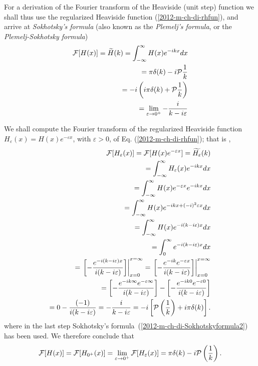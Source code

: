 \fi
For a derivation of  the Fourier transform of the Heaviside (unit step) function
we shall thus use the  regularized Heaviside function (\ref{2012-m-ch-di-rhfun}), and arrive at
{\em Sokhotsky's  formula} (also known as the {\em Plemelj's  formula}, or the {\em Plemelj-Sokhotsky formula})
\begin{equation}
\begin{split}
 {\cal F}[H(x)]=\widetilde{H}(k)=   \int_{-\infty}^\infty  H(x) e^{-i{kx}} dx   \\
\qquad =    \pi \delta(k) -  i {\cal P}  \frac{1}{k} \\
\qquad =   -i \left(i\pi \delta(k) + {\cal P} \frac{1}{k}\right)\\
\qquad =   \lim_{\varepsilon \rightarrow 0^+} -\frac{i}{k-i\varepsilon }
\end{split}
\end{equation}

{\color{OliveGreen}
\bproof
We shall compute the Fourier transform of the regularized Heaviside function
$H_\varepsilon (x) =H(x)e^{-\varepsilon x}$, with $\varepsilon >0$, of Eq. (\ref{2012-m-ch-di-rhfun}); that is  \cite{sommer-di},
\begin{equation}
\begin{split}
 {\cal F}[H_\varepsilon (x)] =
 {\cal F}[H(x)e^{-\varepsilon x}]
=\widetilde{H_\varepsilon }(k)
\\
=   \int_{-\infty}^\infty  H_\varepsilon (x) e^{-i{kx}} dx
\\
=   \int_{-\infty}^\infty  H(x)e^{-\varepsilon x}  e^{-i{kx}} dx
\\
=   \int_{-\infty}^\infty  H(x) e^{-i{kx}+(-i)^2\varepsilon x}  dx
\\
=   \int_{-\infty}^\infty  H(x) e^{-i(k - i \varepsilon ) x}  dx
\\
=   \int_{0}^\infty  e^{-i(k - i \varepsilon ) x}  dx
\\
=  \left. \left[ -\frac{ e^{-i(k - i \varepsilon ) x}}{i(k - i \varepsilon ) } \right] \right|_{x=0}^{x=\infty}
=  \left. \left[ -\frac{ e^{-ik} e^{- \varepsilon   x}}{i(k - i \varepsilon ) } \right] \right|_{x=0}^{x=\infty}
\\
=  \left[ -\frac{ e^{-ik\infty} e^{- \varepsilon  \infty}}{i(k - i \varepsilon ) } \right]
-  \left[ -\frac{ e^{-ik0} e^{- \varepsilon  0}}{i(k - i \varepsilon ) } \right]
\\
=    0 - \frac{ (-1)}{i(k - i \varepsilon ) }
=     -\frac{ i}{k - i \varepsilon  }
= -i \left[ {\cal P} \left(\frac{1}{k}\right) + i \pi \delta (k)  \right]
.
\end{split}
\end{equation}
where in the last step Sokhotsky's  formula~(\ref{2012-m-ch-di-Sokhotskyformula2})
has been used.
We therefore conclude that
\begin{equation}
 {\cal F}[H(x)] =
 {\cal F}[H_{0^+} (x)] =
 \lim_{\varepsilon \rightarrow 0^+} {\cal F}[H_\varepsilon (x)] =
  \pi \delta (k)   -i {\cal P} \left(\frac{1}{k}\right)
.
\label{2012-m-ch-di-fthfu}
\end{equation}

\eproof
}




